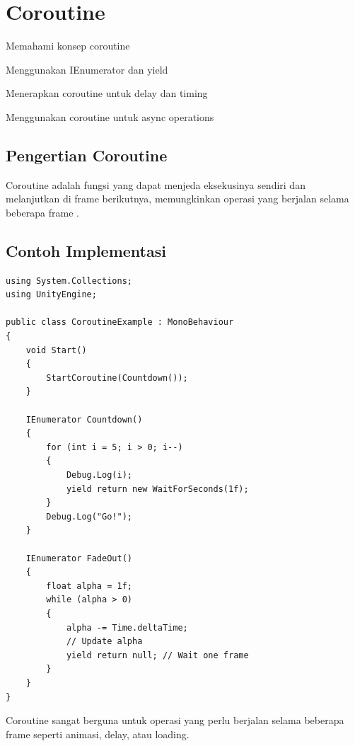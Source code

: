 
\section{Coroutine}

\begin{learningoutcomes}
\item Memahami konsep coroutine
\item Menggunakan IEnumerator dan yield
\item Menerapkan coroutine untuk delay dan timing
\item Menggunakan coroutine untuk async operations
\end{learningoutcomes}

\subsection{Pengertian Coroutine}

\begin{definisi}[Coroutine]
Coroutine adalah fungsi yang dapat menjeda eksekusinya sendiri dan melanjutkan di frame berikutnya, memungkinkan operasi yang berjalan selama beberapa frame \cite{UnityScriptingAPI2024}.
\end{definisi}

\subsection{Contoh Implementasi}

\begin{lstlisting}[language={[Sharp]C}]
using System.Collections;
using UnityEngine;

public class CoroutineExample : MonoBehaviour
{
    void Start()
    {
        StartCoroutine(Countdown());
    }
    
    IEnumerator Countdown()
    {
        for (int i = 5; i > 0; i--)
        {
            Debug.Log(i);
            yield return new WaitForSeconds(1f);
        }
        Debug.Log("Go!");
    }
    
    IEnumerator FadeOut()
    {
        float alpha = 1f;
        while (alpha > 0)
        {
            alpha -= Time.deltaTime;
            // Update alpha
            yield return null; // Wait one frame
        }
    }
}
\end{lstlisting}

\begin{catatan}
Coroutine sangat berguna untuk operasi yang perlu berjalan selama beberapa frame seperti animasi, delay, atau loading.
\end{catatan}

